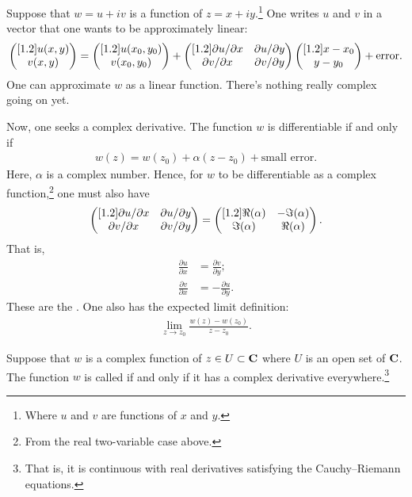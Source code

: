 \documentclass[11pt, oneside,margin=1in]{article}
\begin{document}
Suppose that $w=u+iv$ is a function of $z=x+iy$.\footnote{Where $u$ and $v$ are functions of $x$ and $y$.} One writes $u$ and $v$ in a vector that one wants to be approximately linear:
 \begin{align*}
	 \begin{pmatrix} [1.2] u(x,y) \\ v (x,y)\end{pmatrix} = \begin{pmatrix} [1.2] u (x_0,y_0) \\ v (x_0,y_0)\end{pmatrix} + \begin{pmatrix} [1.2] \partial u/\partial x&\partial u/\partial y\\ \partial v/\partial x&\partial v / \partial y\end{pmatrix}\begin{pmatrix} [1.2] x-x_0\\y-y_0\end{pmatrix} + \mathrm{error}.
\end{align*}
One can approximate $w$ as a linear function. There's nothing really complex going on yet.

Now, one seeks a complex derivative. The function $w$ is differentiable if and only if
\begin{align*}
	w(z) = w (z_0) + \alpha(z-z_0) + \textrm{small error}.
\end{align*}
Here, $\alpha$ is a complex number. Hence, for $w$ to be differentiable as a complex function,\footnote{From the real two-variable case above.} one must also have
\begin{align*}
	\begin{pmatrix} [1.2] \partial u/\partial x&\partial u/\partial y\\ \partial v/\partial x&\partial v / \partial y\end{pmatrix} = \begin{pmatrix} [1.2] \Re (\alpha)&- \Im (\alpha)\\ \Im (\alpha) & \Re (\alpha)\end{pmatrix}.
\end{align*}
That is,
\begin{align*}
	\frac{\partial u}{\partial x} &= \frac{\partial v}{\partial y};\\
	\frac{\partial v}{\partial x}& = - \frac{\partial u}{\partial y}.
\end{align*}
These are the . One also has the expected limit definition:
\begin{align*}
	\lim_{z\to z_0} \frac{w(z) - w (z_0)}{z-z_0}.
\end{align*}

\begin{definition}[ ]\label{}\text{}
Suppose that $w$ is a complex function of $z\in U\subset \mathbf C$ where $U$ is an open set of $\mathbf C$. The function $w$ is called  if and only if it has a complex derivative everywhere.\footnote{That is, it is continuous with real derivatives satisfying the Cauchy--Riemann equations.}
\end{definition}
\end{document}
